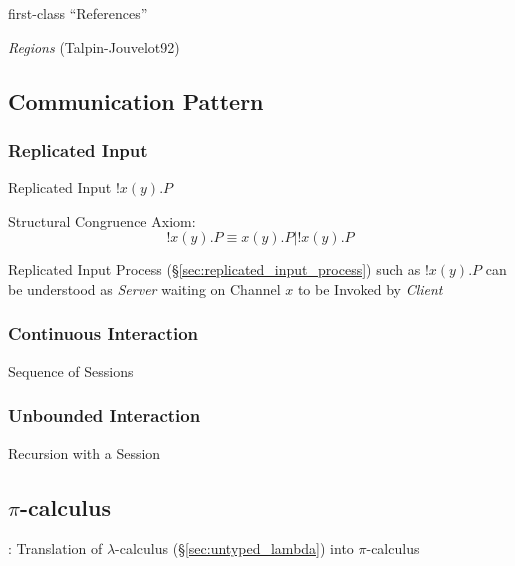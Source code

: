 first-class ``References'' \cite{orchard-yoshida16}

\emph{Regions} (Talpin-Jouvelot92)



\subsection{Communication Pattern}\label{sec:communication_pattern}

\subsubsection{Replicated Input}\label{sec:replicated_input}

Replicated Input $!x(y).P$

Structural Congruence Axiom:
\[
  !x(y).P \equiv x(y).P | !x(y).P
\]

Replicated Input Process (\S\ref{sec:replicated_input_process}) such
as $!x(y).P$ can be understood as \emph{Server} waiting on Channel $x$
to be Invoked by \emph{Client}



\subsubsection{Continuous Interaction}\label{sec:continuous_interaction}

Sequence of Sessions



\subsubsection{Unbounded Interaction}\label{sec:unbounded_interaction}

Recursion with a Session



\subsection{$\pi$-calculus}\label{sec:pi_calculus}

\cite{milner-parrow-walker92}

\cite{milner92}: Translation of $\lambda$-calculus
(\S\ref{sec:untyped_lambda}) into $\pi$-calculus

